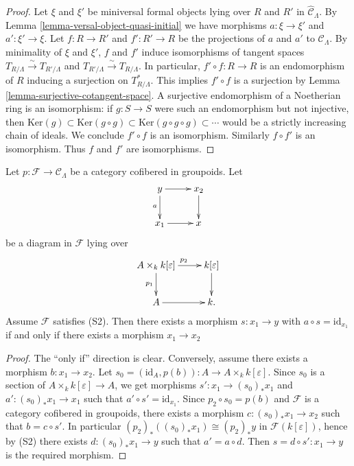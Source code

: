 \begin{proof}
Let $\xi$ and $\xi'$ be miniversal formal objects lying over $R$ and $R'$ in 
$\widehat{\mathcal{C}}_\Lambda$.  By
Lemma \ref{lemma-versal-object-quasi-initial}
we have morphisms $a: \xi \to 
\xi'$ and $a': \xi' \to \xi$.  Let $f:R \to R'$ and $f': R' 
\to R$ be the projections of $a$ and $a'$ to $\mathcal{C}_\Lambda$.  
By minimality of $\xi$ and $\xi'$, $f$ and $f'$ induce isomorphisms of tangent 
spaces $T_{R/\Lambda} \xrightarrow{\sim} T_{R'/\Lambda}$ and $T_{R'/\Lambda} 
\xrightarrow{\sim} T_{R/\Lambda}$.  In particular, $f' \circ f: R \to 
R$ is an endomorphism of $R$ inducing a surjection on $T^*_{R/\Lambda}$. This 
implies $f' \circ f$ is a surjection by Lemma 
\ref{lemma-surjective-cotangent-space}. A surjective endomorphism of a 
Noetherian ring is an isomorphism: if $g: S \to S$ were such an 
endomorphism but not injective, then $\text{Ker}(g) \subset 
\text{Ker}(g \circ g) \subset \text{Ker}(g \circ g \circ g) \subset 
\cdots$ would be a strictly increasing chain of ideals.  We conclude $f' \circ 
f$ is an isomorphism.  Similarly $f \circ f'$ is an isomorphism.  Thus $f$ and 
$f'$ are isomorphisms.
\end{proof}

\begin{lemma}
\label{lemma-lifting-section}
Let $p: \mathcal{F} \to \mathcal{C}_\Lambda$ be a category cofibered in 
groupoids.  Let 
\[
\xymatrix{
y \ar[r] \ar[d]_{a} & x_2 \ar[d] \\
x_1 \ar[r]        & x
}
\]
be a diagram in $\mathcal{F}$ lying over
\[
\xymatrix{
A \times_{k} k[\varepsilon] \ar[r]^{p_2} \ar[d]_{p_1} & k[\varepsilon] \ar[d] \\
A \ar[r] & k.
}
\]
Assume $\mathcal{F}$ satisfies (S2). Then there exists a morphism 
$s: x_1 \to y$ with $a \circ s = \text{id}_{x_1}$ if and only if 
there exists a morphism $x_1 \to x_2$
\end{lemma}

\begin{proof}
The ``only if'' direction is clear.  Conversely, assume there exists a morphism 
$b: x_1 \to x_2$.  Let $s_0 = (\text{id}_A, p(b)): A \to 
A \times_{k} k[\varepsilon]$.  Since $s_0$ is a section of $A \times_{k} 
k[\varepsilon] \to A$, we get morphisms $s': x_1 \to 
(s_0)_*x_1$ and $a': (s_0)_*x_1 \to x_1$ such that $a' \circ s' = 
\text{id}_{x_1}$.  Since $p_2 \circ s_0 = p(b)$ and $\mathcal{F}$ is a 
category cofibered in groupoids, there exists a morphism $c: (s_0)_*x_1 
\to x_2$ such that $b = c \circ s'$.  In particular 
$(p_2)_*((s_0)_*x_1) \cong (p_2)_*y$ in $\mathcal{F}(k[\varepsilon])$, hence by 
(S2) there exists $d: (s_0)_*x_1 \to y$ such that $a' = a \circ d$.  
Then $s = d \circ s': x_1 \to y$ is the required morphism.
\end{proof}

